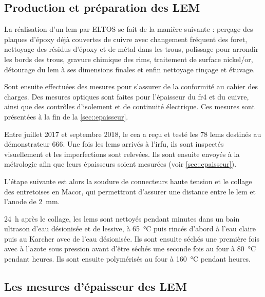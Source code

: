         \subsection{Production et préparation des LEM}
        
            La réalisation d'un \gls{lem} par ELTOS se fait de la manière suivante : perçage des plaques d'époxy déjà couvertes de cuivre avec changement fréquent des foret, nettoyage des résidus d'époxy et de métal dans les trous, polissage pour arrondir les bords des trous, gravure chimique des rims, traitement de surface nickel/or, détourage du \gls{lem} à ses dimensions finales et enfin nettoyage rinçage et étuvage.
                
            Sont ensuite effectuées des mesures pour s'assurer de la conformité au cahier des charges. Des mesures optiques sont faites pour l'épaisseur du \gls{fr4} et du cuivre, ainsi que des contrôles d'isolement et de continuité électrique. Ces mesures sont présentées à la fin de la \autoref{sec::epaisseur}.
            
            Entre juillet 2017 et septembre 2018, le \gls{cea} a reçu et testé les 78 \glspl{lem} destinés au démonstrateur 666. Une fois les \glspl{lem} arrivés à l'\gls{irfu}, ils sont inspectés visuellement et les imperfections sont relevées. Ils sont ensuite envoyés à la métrologie afin que leurs épaisseurs soient mesurées (voir \autoref{sec::epaisseur}).
            
            L'étape suivante est alors la soudure de connecteurs haute tension et le collage des entretoises en Macor, qui permettront d'assurer une distance entre le \gls{lem} et l'anode de \SI{2}{\milli\meter}.
            
            \SI{24}{\hour} après le collage, les \glspl{lem} sont nettoyés pendant  minutes dans un bain ultrason d'eau désionisée et de lessive, à \SI{65}{\celsius} puis rincés d'abord à l'eau claire puis au Karcher avec de l'eau désionisée. Ils sont ensuite séchés une première fois avec à l'azote sous pression avant d'être séchés une seconde fois au four à \SI{80}{\celsius} pendant  heures. Ils sont ensuite polymérisés au four à \SI{160}{\celsius} pendant  heures.
        
        \subsection{Les mesures d’épaisseur des LEM}\label{sec::epaisseur}
        
